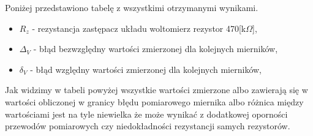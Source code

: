 \documentclass[11pt]{article}
\begin{document}
    \newpage
    Poniżej przedstawiono tabelę z wszystkimi otrzymanymi wynikami.
    \begin{center}
    \end{center}
    {\footnotesize
        \begin{itemize}
            \setlength\itemsep{0em}
            \item[] \boldmath$R_z$ - rezystancja zastępacz układu woltomierz rezystor 470[k$\Omega$],
            \item[] \boldmath$\Delta_V$ - błąd bezwzględny wartości zmierzonej dla kolejnych mierników,
            \item[] \boldmath$\delta_V$ - błąd względny wartości zmierzonej dla kolejnych mierników,
        \end{itemize}}
    Jak widzimy w tabeli powyżej wszystkie wartości zmierzone albo zawierają
    się w wartości obliczonej w granicy błędu pomiarowego miernika albo różnica
    między wartościami jest na tyle niewielka że może wynikać z dodatkowej
    oporności przewodów pomiarowych czy niedokładności rezystancji samych rezystorów.
\end{document}
